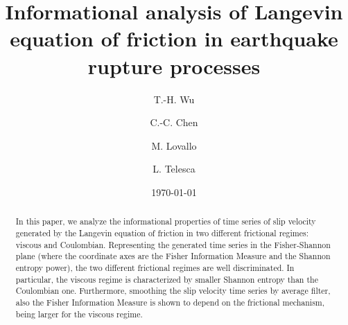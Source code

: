 \documentclass[%
 aip,
rsi,%
 amsmath,amssymb,
 reprint,%
]{revtex4-1}
\begin{document}

\title[Sample title]{Informational analysis of Langevin equation of friction in earthquake rupture processes}

\author{T.-H. Wu}
\author{C.-C. Chen}%
{}

\author{M. Lovallo}
%
\author{L. Telesca}
%

\date{\today}%

\begin{abstract}
    In this paper, we analyze the informational properties of time series of slip velocity generated by the Langevin equation of friction in two different frictional regimes: viscous and Coulombian. Representing the generated time series in the Fisher-Shannon plane (where the coordinate axes are the Fisher Information Measure and the Shannon entropy power), the two different frictional regimes are well discriminated. In particular, the viscous regime is characterized by smaller Shannon entropy than the Coulombian one. Furthermore, smoothing the slip velocity time series by average filter, also the Fisher Information Measure is shown to depend on the frictional mechanism, being larger for the viscous regime.
\end{abstract}

\maketitle
\end{document}
